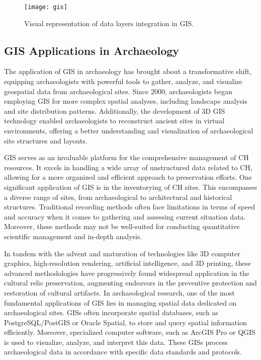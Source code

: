 \begin{figure}[h!]
    \centering
    \texttt{[image: gis]}
    \caption{Visual representation of data layers integration in \gls{GIS}. ~\cite{gao_data_layers}}
    \label{fig:gis}
\end{figure}
\FloatBarrier

\subsection{GIS Applications in Archaeology}
\label{sub:gis_archeology}

The application of \gls{GIS} in archaeology has brought about a transformative shift, equipping archaeologists with powerful tools to gather, analyze, 
and visualize geospatial data from archaeological sites. Since 2000, archaeologists began employing \gls{GIS} for more complex spatial analyses, including landscape analysis and site distribution 
patterns. Additionally, the development of \gls{3D} \gls{GIS} technology enabled archaeologists to reconstruct ancient sites in virtual environments, offering a 
better understanding and visualization of archaeological site structures and layouts. ~\cite{yao2023overview}


\gls{GIS} serves as an invaluable platform for the comprehensive management of \gls{CH} resources. It excels in handling a wide array of
unstructured data related to \gls{CH}, allowing for a more organized and efficient approach to preservation efforts. One significant 
application of \gls{GIS} is in the inventorying of \gls{CH} sites. This encompasses a diverse range of sites, from archaeological to 
architectural and historical structures. Traditional recording methods often face limitations in terms of speed and accuracy when
it comes to gathering and assessing current situation data. Moreover, these methods may not be well-suited for conducting quantitative 
scientific management and in-depth analysis. 

In tandem with the advent and maturation of technologies like \gls{3D} computer graphics, high-resolution rendering, artificial intelligence, 
and \gls{3D} printing, these advanced methodologies have progressively found widespread application in the cultural relic preservation, 
augmenting endeavors in the preventive protection and restoration of cultural artifacts. In archaeological research, one of the most fundamental applications of GIS lies in managing spatial data dedicated on archaeological sites.
\glspl{GIS} often incorporate spatial databases, such as PostgreSQL/PostGIS or Oracle Spatial, to store and query spatial information efficiently. 
Moreover, specialized computer software, such as ArcGIS Pro or QGIS is used to visualize, analyze, and interpret this data. These \glspl{GIS} process archaeological data in 
accordance with specific data standards and protocols.

